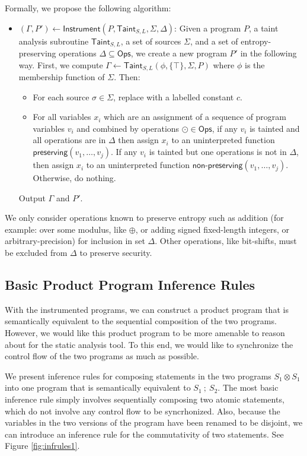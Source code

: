 \documentclass[letterpaper,twocolumn,10pt]{article}
\newcommand{\cross}{\otimes{}}
\begin{document}
Formally, we propose the following algorithm:

\begin{itemize}
    \item $(\Gamma, P') \gets \mathsf{Instrument}(P, \mathsf{Taint}_{S,L}, \Sigma, \Delta)$: Given a program $P$, a taint analysis subroutine $\mathsf{Taint}_{S,L}$, a set
    of sources $\Sigma$, and a set of entropy-preserving operations $\Delta \subseteq \mathsf{Ops}$, we create a new program $P'$ in the following way. First,
    we compute $\Gamma \gets \mathsf{Taint}_{S,L}(\phi, \{\top\}, \Sigma, P)$ where $\phi$ is the membership function of $\Sigma$. Then:
    \begin{itemize}
        \item For each source $\sigma \in \Sigma$, replace with a labelled constant $c$.
        \item For all variables $x_i$ which are an assignment of a sequence of program variables $v_i$ and combined by operations $\odot \in \mathsf{Ops}$,
        if any $v_i$ is tainted and all operations are in $\Delta$ then assign $x_i$ to an uninterpreted function $\textsf{preserving}(v_1, \ldots, v_j)$. If
        any $v_i$ is tainted but one operations is not in $\Delta$, then assign $x_i$ to an uninterpreted function $\textsf{non-preserving}(v_1, \ldots, v_j)$.
        Otherwise, do nothing.
    \end{itemize}
    Output $\Gamma$ and $P'$.
\end{itemize}

We only consider operations known to preserve entropy such as addition (for example: over some modulus, like $\oplus$, or adding signed fixed-length integers, or arbitrary-precision) for inclusion in set $\Delta$.
Other operations, like bit-shifts, must be excluded from $\Delta$ to preserve security.

\subsection{Basic Product Program Inference Rules}
\label{sec:basicpprules}

With the instrumented programs, we can construct a product program that is semantically equivalent to the sequential composition of the two programs. However, we would like this product program to be more amenable to reason about for the static analysis tool. To this end, we would like to synchronize the control flow of the two programs as much as possible. 

We present inference rules for composing statements in the two programs $S_1 \cross S_1$ into one program that is semantically equivalent to $S_1\ ;\ S_2$. The most basic inference rule simply involves sequentially composing two atomic statements, which do not involve any control flow to be syncrhonized. Also, because the variables in the two versions of the program have been renamed to be disjoint, we can introduce an inference rule for the commutativity of two statements. See Figure \ref{fig:infrules1}.
\end{document}
